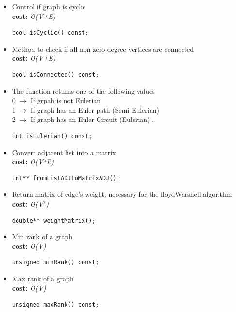 \documentclass[10pt,a4paper]{article}
\begin{document}
\begin{itemize}
\item Control if graph is cyclic\\
\textbf{cost:} \emph{O(V+E)}
\begin{lstlisting}
bool isCyclic() const;   
\end{lstlisting}

\item Method to check if all non-zero degree vertices are connected\\
\textbf{cost:} \emph{O(V+E)}
\begin{lstlisting}
bool isConnected() const;   
\end{lstlisting}

\item The function returns one of the following values\\
   0 $\rightarrow$ If grpah is not Eulerian\\
   1 $\rightarrow$ If graph has an Euler path (Semi-Eulerian)\\
   2 $\rightarrow$ If graph has an Euler Circuit (Eulerian) .\\
\begin{lstlisting}
int isEulerian() const;    
\end{lstlisting}

\item Convert adjacent list into a matrix\\
\textbf{cost:} \emph{O(V*E)}
\begin{lstlisting}
int** fromListADJToMatrixADJ();  
\end{lstlisting}
 
\item Return matrix of edge's weight, necessary for the floydWarshell algorithm\\
\textbf{cost:} \emph{O(V$^2$)}
\begin{lstlisting}
double** weightMatrix(); 
\end{lstlisting}
    
\item Min rank of a graph\\
\textbf{cost:} \emph{O(V)}
\begin{lstlisting}
unsigned minRank() const; 
\end{lstlisting}
  
\item Max rank of a graph\\
\textbf{cost:} \emph{O(V)}
\begin{lstlisting}
unsigned maxRank() const;
\end{lstlisting}
   

\end{itemize}
\end{document}
